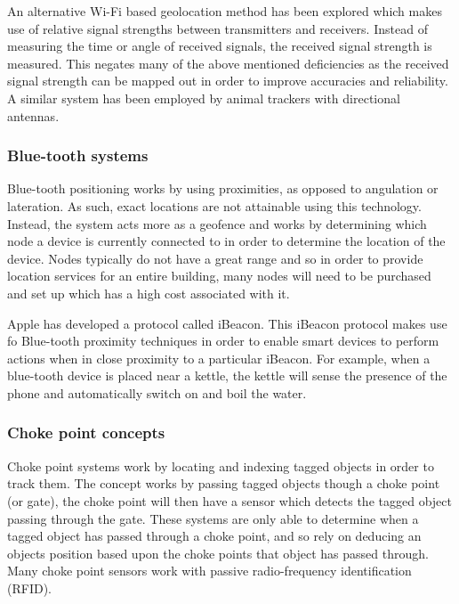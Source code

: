 \documentclass[11pt,a4paper]{report}
\begin{document}
			An alternative Wi-Fi based geolocation method has been explored which makes use of relative signal strengths between transmitters and receivers. Instead of measuring the time or angle of received signals, the received signal strength is measured. This negates many of the above mentioned deficiencies as the received signal strength can be mapped out in order to improve accuracies and reliability. A similar system has been employed by animal trackers with directional antennas.
			\parencite{yongguang_chen_signal_2002}
	
		\subsubsection{Blue-tooth systems}
			Blue-tooth positioning works by using proximities, as opposed to angulation or lateration. As such, exact locations are not attainable using this technology. Instead, the system acts more as a geofence and works by determining which node a device is currently connected to in order to determine the location of the device. Nodes typically do not have a great range and so in order to provide location services for an entire building, many nodes will need to be purchased and set up which has a high cost associated with it.
		
			Apple has developed a protocol called iBeacon. This iBeacon protocol makes use fo Blue-tooth proximity techniques in order to enable smart devices to perform actions when in close proximity to a particular iBeacon. For example, when a blue-tooth device is placed near a kettle, the kettle will sense the presence of the phone and automatically switch on and boil the water.
			\parencite{_everything_????}
		
		\subsubsection{Choke point concepts}
			\label{choke_points}
			Choke point systems work by locating and indexing tagged objects in order to track them. The concept works by passing tagged objects though a choke point (or gate), the choke point will then have a sensor which detects the tagged object passing through the gate. These systems are only able to determine when a tagged object has passed through a choke point, and so rely on deducing an objects position based upon the choke points that object has passed through.
			Many choke point sensors work with passive radio-frequency identification (RFID).
			\parencite{reza_investigation_2008}
		
\end{document}
